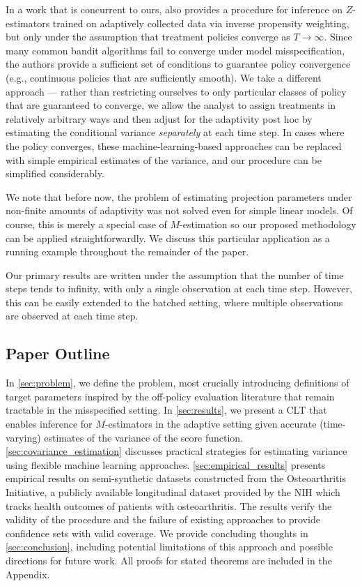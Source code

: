 \documentclass[11pt]{article}
\begin{document}

In a work that is concurrent to ours,  \cite{guo2025statisticalinferencemisspecifiedcontextual} also provides a procedure for inference on $Z$-estimators trained on adaptively collected data via inverse propensity weighting, but only under the assumption that treatment policies converge as $T \rightarrow \infty$. Since many common bandit algorithms fail to converge under model misspecification, the authors provide a sufficient set of conditions to guarantee policy convergence (e.g., continuous policies that are sufficiently smooth). We take a different approach --- rather than restricting ourselves to only particular classes of policy that are guaranteed to converge, we allow the analyst to assign treatments in relatively arbitrary ways and then adjust for the adaptivity post hoc by estimating the conditional variance \emph{separately} at each time step. In cases where the policy converges, these machine-learning-based approaches can be replaced with simple empirical estimates of the variance, and our procedure can be simplified considerably. 

We note that before now, the problem of estimating projection parameters under non-finite amounts of adaptivity was not solved even for simple linear models. Of course, this is merely a special case of $M$-estimation so our proposed methodology can be applied straightforwardly. We discuss this particular application as a running example throughout the remainder of the paper. 


Our primary results are written under the assumption that the number of time steps tends to infinity, with only a single observation at each time step. However, this can be easily extended to the batched setting, where multiple observations are observed at each time step. 


\subsection{Paper Outline}
In \cref{sec:problem}, we define the problem, most crucially introducing definitions of target parameters inspired by the off-policy evaluation literature that remain tractable in the misspecified setting. In \cref{sec:results}, we present a CLT that enables inference for $M$-estimators in the adaptive setting given accurate (time-varying) estimates of the variance of the score function. \cref{sec:covariance_estimation} discusses practical strategies for estimating variance using flexible machine learning approaches. \cref{sec:empirical_results} presents empirical results on semi-synthetic datasets constructed from the Osteoarthritis Initiative, a publicly available longitudinal dataset provided by the NIH which tracks health outcomes of patients with osteoarthritis. The results verify the validity of the procedure and the failure of existing approaches to provide confidence sets with valid coverage. We provide concluding thoughts in \cref{sec:conclusion}, including potential limitations of this approach and possible directions for future work. All proofs for stated theorems are included in the Appendix. 
\end{document}
